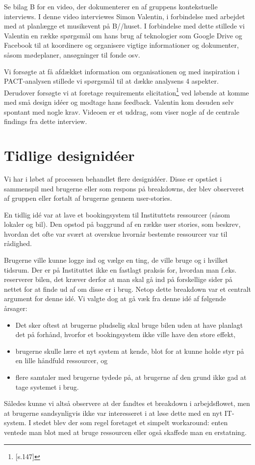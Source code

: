 Se bilag B for en video, der dokumenterer en af gruppens kontekstuelle interviews. I denne video interviewes Simon Valentin, i forbindelse med arbejdet med at planlægge et musikevent på B//huset. I forbindelse med dette stillede vi Valentin en række spørgsmål om hans brug af teknologier som Google Drive og Facebook til at koordinere og organisere vigtige informationer og dokumenter, såsom mødeplaner, ansøgninger til fonde osv.

Vi forsøgte at få afdækket information om organisationen og med inspiration i PACT-analysen stillede vi spørgsmål til at dække analysens 4 aspekter. Derudover forsøgte vi at foretage requirements elicitation\footnote{\citep{Benyon}[s.147]} ved løbende at komme med små design idéer og modtage hans feedback. Valentin kom desuden selv spontant med nogle krav. Videoen er et uddrag, som viser nogle af de centrale findings fra dette interview.

\section{Tidlige designidéer}
Vi har i løbet af processen behandlet flere designidéer. Disse er opstået i sammenspil med brugerne eller som respons på breakdowns, der blev observeret af gruppen eller fortalt af brugerne gennem user-stories.

En tidlig idé var at lave et bookingsystem til Instituttets ressourcer (såsom lokaler og bil). Den opstod på baggrund af en række user stories, som beskrev, hvordan det ofte var svært at overskue hvornår bestemte ressourcer var til rådighed.

Brugerne ville kunne logge ind og vælge en ting, de ville bruge og i hvilket tidsrum. Der er på Instituttet ikke en fastlagt praksis for, hvordan man f.eks. reserverer bilen, det kræver derfor at man skal gå ind på forskellige sider på nettet for at finde ud af om disse er i brug. Netop dette breakdown var et centralt argument for denne idé. 
Vi valgte dog at gå væk fra denne idé af følgende årsager: 
\begin{itemize}
	\item Det sker oftest at brugerne pludselig skal bruge bilen uden at have planlagt det på forhånd, hvorfor et bookingsystem ikke ville have den store effekt,
	\item brugerne skulle lære et nyt system at kende, blot for at kunne holde styr på en lille håndfuld ressourcer, og
	\item flere samtaler med brugerne tydede på, at brugerne af den grund ikke gad at tage systemet i brug.
\end{itemize}
Således kunne vi altså observere at der fandtes et breakdown i arbejdsflowet, men at brugerne sandsynligvis ikke var interesseret i at løse dette med en nyt IT-system. I stedet blev der som regel foretaget et simpelt workaround: enten ventede man blot med at bruge ressourcen eller også skaffede man en erstatning.


